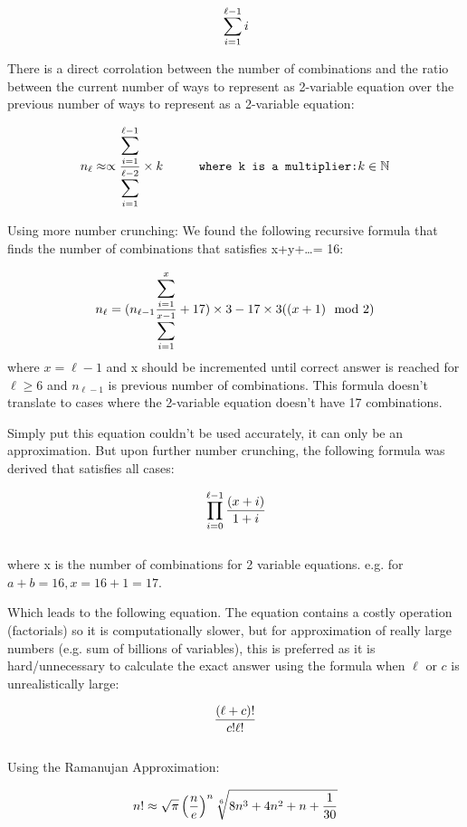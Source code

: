\documentclass[11pt]{article}
\theoremstyle{definition}
\theoremstyle{remark}
\begin{document}
\[
\\ \sum_{i=1}^{\ell-1} i
\]

There is a direct corrolation between the number of combinations and the ratio between the current number of ways to represent as 2-variable equation over the previous number of ways to represent as a 2-variable equation:

\[
		\\ n_\ell \approx \propto \frac{\displaystyle \sum_{i=1}^{\ell-1}}{\displaystyle \sum_{i=1}^{\ell-2}} \times k \hspace{1cm} \texttt{where k is a multiplier:} k \in \mathbb{N} 
\]

Using more number crunching: We found the following recursive formula that finds the number of combinations that satisfies x+y+\dots = 16:

\[
		\\ n_\ell = (n_{\ell-1} \frac{\displaystyle \sum_{i=1}^{x}}{\displaystyle \sum_{i=1}^{x-1}} +17) \times 3 - 17 \times 3( (x+1) \mod 2 )
\]
where $x = \ell-1$ \quad and x should be incremented until correct answer is reached for $\ell \geq 6$ and $n_{\ell-1}$ is previous number of combinations.
This formula doesn't translate to cases where the 2-variable equation doesn't have 17 combinations.

Simply put this equation couldn't be used accurately, it can only be an approximation. But upon further number crunching, the following formula was derived that satisfies all cases:

\[
\\ \prod_{i=0}^{\ell-1} \frac{(x+i)}{1+i}
\]
\\

where x is the number of combinations for 2 variable equations. e.g. for $a+b = 16, x = 16+1 = 17$.

Which leads to the following equation. The equation contains a costly operation (factorials) so it is computationally slower, but for approximation of really large numbers (e.g. sum of billions of variables), this is preferred as it is hard/unnecessary to calculate the exact answer using the formula when $\ell$ or $c$ is unrealistically large:

\[
\\ \frac{(\ell+c)!}{c!\ell!}
\]
\\

Using the Ramanujan Approximation:

\[
\\ n! \approx \sqrt{\pi}\left(\frac{n}{e}\right)^n\sqrt[6]{8n^3 + 4n^2 + n + \frac{1}{30}}
\]
\end{document}
